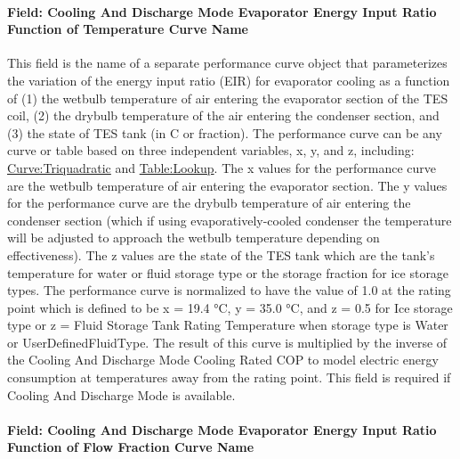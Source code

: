 \paragraph{Field: Cooling And Discharge Mode Evaporator Energy Input Ratio Function of Temperature Curve Name}\label{field-cooling-and-discharge-mode-evaporator-energy-input-ratio-function-of-temperature-curve-name}

This field is the name of a separate performance curve object that parameterizes the variation of the energy input ratio (EIR) for evaporator cooling as a function of (1) the wetbulb temperature of air entering the evaporator section of the TES coil, (2) the drybulb temperature of the air entering the condenser section, and (3) the state of TES tank (in C or fraction). The performance curve can be any curve or table based on three independent variables, x, y, and z, including: \hyperref[curvetriquadratic]{Curve:Triquadratic} and \hyperref[tablelookup]{Table:Lookup}. The x values for the performance curve are the wetbulb temperature of air entering the evaporator section. The y values for the performance curve are the drybulb temperature of air entering the condenser section (which if using evaporatively-cooled condenser the temperature will be adjusted to approach the wetbulb temperature depending on effectiveness). The z values are the state of the TES tank which are the tank's temperature for water or fluid storage type or the storage fraction for ice storage types. The performance curve is normalized to have the value of 1.0 at the rating point which is defined to be x = 19.4 °C, y = 35.0 °C, and z = 0.5 for Ice storage type or z = Fluid Storage Tank Rating Temperature when storage type is Water or UserDefinedFluidType. The result of this curve is multiplied by the inverse of the Cooling And Discharge Mode Cooling Rated COP to model electric energy consumption at temperatures away from the rating point. This field is required if Cooling And Discharge Mode is available.

\paragraph{Field: Cooling And Discharge Mode Evaporator Energy Input Ratio Function of Flow Fraction Curve Name}\label{field-cooling-and-discharge-mode-evaporator-energy-input-ratio-function-of-flow-fraction-curve-name}

